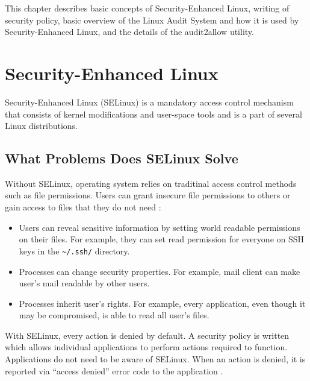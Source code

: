 This chapter describes basic concepts of Security-Enhanced Linux, writing of
security policy, basic overview of the Linux Audit System and how it is used by
Security-Enhanced Linux, and the details of the audit2allow utility.

\section{Security-Enhanced Linux}

Security-Enhanced Linux (SELinux) is a mandatory access control mechanism that
consists of kernel modifications and user-space tools and is a part of several
Linux distributions.

\subsection{What Problems Does SELinux Solve}
Without SELinux, operating system relies on traditinal access control methods
such as file permissions. Users can grant insecure file permissions to others or
gain access to files that they do not need \cite{selinuxguide}:
\begin{itemize}
    \item Users can reveal sensitive information by setting world readable
        permissions on their files. For example, they can set read permission
        for everyone on SSH keys in the \texttt{\textasciitilde/.ssh/}
        directory.
    \item Processes can change security properties. For example, mail client can
        make user's mail readable by other users.
    \item Processes inherit user's rights. For example, every application, even
        though it may be compromised, is able to read all user's files.
\end{itemize}

With SELinux, every action is denied by default. A security policy is written
which allows individual applications to perform actions required to function.
Applications do not need to be aware of SELinux. When an action is denied, it is
reported via ``access denied'' error code to the application \cite{centoshowto}.

